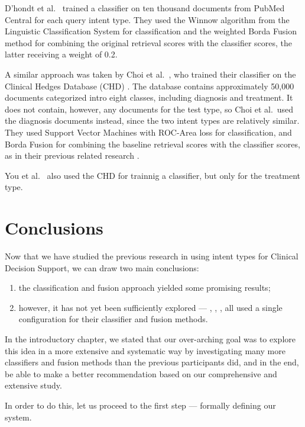 D’hondt et al.\ \cite{limsi2015} trained a classifier on ten thousand documents from PubMed Central
for each query intent type. They used the Winnow algorithm from the Linguistic Classification System
for classification and the weighted Borda Fusion method for combining the original retrieval scores
with the classifier scores, the latter receiving a weight of 0.2.

A similar approach was taken by Choi et al.\ \cite{choi},
who trained their classifier on the Clinical Hedges Database (CHD) \cite{chd}.
The database contains approximately 50,000 documents categorized
intro eight classes, including diagnosis and treatment.
It does not contain, however, any documents for the test type, so Choi et al.\ used the diagnosis documents instead,
since the two intent types are relatively similar.
They used Support Vector Machines with ROC-Area loss for classification,
and Borda Fusion for combining the baseline retrieval
scores with the classifier scores, as in their previous related research \cite{choi-prev}.

You et al.\ \cite{FDUMedSearch} also used the CHD for trainnig a classifier, but only for the treatment type.

\section{Conclusions}
Now that we have studied the previous research in
using intent types for Clinical Decision Support, we can draw two main conclusions:
\begin{enumerate}
 \item the classification and fusion approach yielded some promising results;
 \item however, it has not yet been sufficiently explored --- \cite{choi}, \cite{FDUMedSearch}, \cite{soldani}, \cite{limsi2015}
 all used a single configuration for their classifier and fusion methods.
\end{enumerate}

In the introductory chapter, we stated that our over-arching goal was to
explore this idea in a more extensive and systematic way by investigating
many more classifiers and fusion methods than the previous participants did, and in the end,
be able to make a better recommendation based on our comprehensive and extensive study.

In order to do this, let us proceed to the first step --- formally defining our system.


